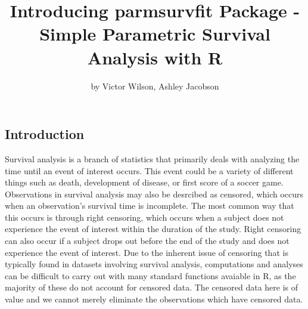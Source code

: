 \title{Introducing parmsurvfit Package - Simple Parametric Survival Analysis
with R}
\author{by Victor Wilson, Ashley Jacobson}

\maketitle



\hypertarget{introduction}{%
\subsection{Introduction}\label{introduction}}

Survival analysis is a branch of statistics that primarily deals with
analyzing the time until an event of interest occurs. This event could
be a variety of different things such as death, development of disease,
or first score of a soccer game. Observations in survival analysis may
also be desrcibed as censored, which occurs when an observation's
survival time is incomplete. The most common way that this occurs is
through right censoring, which occurs when a subject does not experience
the event of interest within the duration of the study. Right censoring
can also occur if a subject drops out before the end of the study and
does not experience the event of interest. Due to the inherent issue of
censoring that is typically found in datasets involving survival
analysis, computations and analyses can be difficult to carry out with
many standard functions avaiable in R, as the majority of these do not
account for censored data. The censored data here is of value and we
cannot merely eliminate the observations which have censored data.


